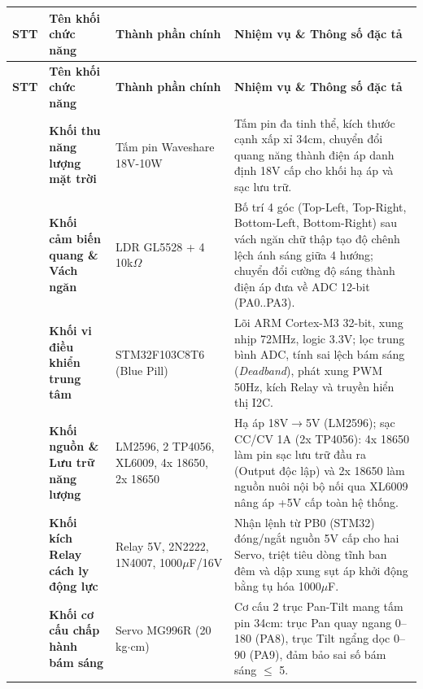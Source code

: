 \documentclass[12pt,a4paper]{report}
\begin{document}
{
\small
\setlength{\LTleft}{0pt}\setlength{\LTright}{0pt}
\begin{longtable}{>{\raggedright\arraybackslash}p{}>{\raggedright\arraybackslash}p{}>{\raggedright\arraybackslash}p{}>{\raggedright\arraybackslash}p{}}
\toprule
\textbf{STT} & \textbf{Tên khối chức năng} & \textbf{Thành phần chính} & \textbf{Nhiệm vụ \& Thông số đặc tả} \\
\midrule
\endfirsthead
\toprule
\textbf{STT} & \textbf{Tên khối chức năng} & \textbf{Thành phần chính} & \textbf{Nhiệm vụ \& Thông số đặc tả} \\
\midrule
\endhead
\bottomrule
\endfoot
\bottomrule
\endlastfoot
1 & \textbf{Khối thu năng lượng mặt trời} & Tấm pin Waveshare 18V-10W & Tấm pin đa tinh thể, kích thước cạnh xấp xỉ 34cm, chuyển đổi quang năng thành điện áp danh định 18V cấp cho khối hạ áp và sạc lưu trữ. \\
2 & \textbf{Khối cảm biến quang \& Vách ngăn} & 4\texttimes{} LDR GL5528 + 4\texttimes{} 10k\ensuremath{\Omega} & Bố trí 4 góc (Top-Left, Top-Right, Bottom-Left, Bottom-Right) sau vách ngăn chữ thập tạo độ chênh lệch ánh sáng giữa 4 hướng; chuyển đổi cường độ sáng thành điện áp đưa về ADC 12-bit (PA0..PA3). \\
3 & \textbf{Khối vi điều khiển trung tâm} & STM32F103C8T6 (Blue Pill) & Lõi ARM Cortex-M3 32-bit, xung nhịp 72MHz, logic 3.3V; lọc trung bình ADC, tính sai lệch bám sáng (\textit{Deadband}), phát xung PWM 50Hz, kích Relay và truyền hiển thị I2C. \\
4 & \textbf{Khối nguồn \& Lưu trữ năng lượng} & LM2596, 2\texttimes{} TP4056, XL6009, 4x 18650, 2x 18650 & Hạ áp 18V\ensuremath{\to}5V (LM2596); sạc CC/CV 1A (2x TP4056): 4x 18650 làm pin sạc lưu trữ đầu ra (Output độc lập) và 2x 18650 làm nguồn nuôi nội bộ nối qua XL6009 nâng áp +5V cấp toàn hệ thống. \\
5 & \textbf{Khối kích Relay cách ly động lực} & Relay 5V, 2N2222, 1N4007, 1000\ensuremath{\mu}F/16V & Nhận lệnh từ PB0 (STM32) đóng/ngắt nguồn 5V cấp cho hai Servo, triệt tiêu dòng tĩnh ban đêm và dập xung sụt áp khởi động bằng tụ hóa 1000\ensuremath{\mu}F. \\
6 & \textbf{Khối cơ cấu chấp hành bám sáng} & 2\texttimes{} Servo MG996R (20 kg\ensuremath{\cdot}cm) & Cơ cấu 2 trục Pan-Tilt mang tấm pin 34cm: trục Pan quay ngang 0\textdegree{}--180\textdegree{} (PA8), trục Tilt ngẩng dọc 0\textdegree{}--90\textdegree{} (PA9), đảm bảo sai số bám sáng \ensuremath{\le} \textpm{}5\textdegree{}. \\

\end{longtable}}
\end{document}
